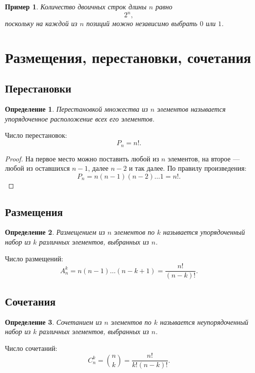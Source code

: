 \documentclass[12pt,a4paper]{article}
\newtheorem{definition}{Определение}
\newtheorem{example}{Пример}
\begin{document}
\begin{example}
Количество двоичных строк длины $n$ равно
\[
2^n,
\]
поскольку на каждой из $n$ позиций можно независимо выбрать $0$ или $1$.
\end{example}

\section{Размещения, перестановки, сочетания}

\subsection{Перестановки}

\begin{definition}
Перестановкой множества из $n$ элементов называется упорядоченное расположение всех его элементов.
\end{definition}

Число перестановок:
\[
P_n = n!.
\]

\begin{proof}
На первое место можно поставить любой из $n$ элементов, на второе --- любой из оставшихся $n-1$, далее $n-2$ и так далее. По правилу произведения:
\[
P_n = n(n-1)(n-2)\dots 1 = n!.
\]
\end{proof}

\subsection{Размещения}

\begin{definition}
Размещением из $n$ элементов по $k$ называется упорядоченный набор из $k$ различных элементов, выбранных из $n$.
\end{definition}

Число размещений:
\[
A_n^k = n(n-1)\dots(n-k+1) = \frac{n!}{(n-k)!}.
\]

\subsection{Сочетания}

\begin{definition}
Сочетанием из $n$ элементов по $k$ называется неупорядоченный набор из $k$ различных элементов, выбранных из $n$.
\end{definition}

Число сочетаний:
\[
C_n^k = \binom{n}{k} = \frac{n!}{k!(n-k)!}.
\]
\end{document}

